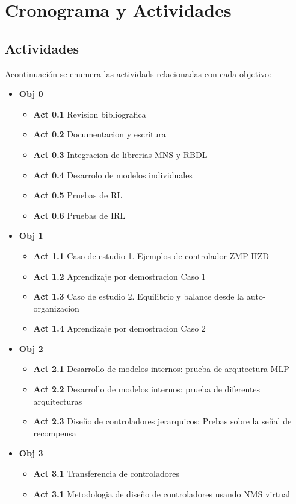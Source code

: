 
\chapter{Cronograma y Actividades}
\label{chp:chrome}


\section{Actividades}
\label{sec:activities}

Acontinuaci\'on se enumera las actividads relacionadas con cada objetivo:

\begin{itemize}
\item \textbf{Obj 0}
  \begin{itemize}
  \item \textbf{Act 0.1} Revision bibliografica
  \item \textbf{Act 0.2} Documentacion y escritura
  \item \textbf{Act 0.3} Integracion de librerias MNS y RBDL
  \item \textbf{Act 0.4} Desarrolo de modelos individuales
  \item \textbf{Act 0.5} Pruebas de RL
  \item \textbf{Act 0.6} Pruebas de IRL
  \end{itemize}
\item \textbf{Obj 1}
  \begin{itemize}
  \item \textbf{Act 1.1} Caso de estudio 1. Ejemplos de controlador ZMP-HZD
  \item \textbf{Act 1.2} Aprendizaje por demostracion Caso 1
  \item \textbf{Act 1.3} Caso de estudio 2. Equilibrio y balance desde la auto-organizacion
  \item \textbf{Act 1.4} Aprendizaje por demostracion Caso 2
  \end{itemize}
\item \textbf{Obj 2}
  \begin{itemize}
  \item \textbf{Act 2.1} Desarrollo de modelos internos: prueba de arqutectura MLP
  \item \textbf{Act 2.2} Desarrollo de modelos internos: prueba de diferentes arquitecturas
  \item \textbf{Act 2.3} Dise\~no de controladores jerarquicos: Prebas sobre la se\~nal de recompensa
  \end{itemize}
\item \textbf{Obj 3}
  \begin{itemize}
  \item \textbf{Act 3.1} Transferencia de controladores
  \item \textbf{Act 3.1} Metodologia de dise\~no de controladores usando NMS virtual
  \end{itemize}
\end{itemize}

